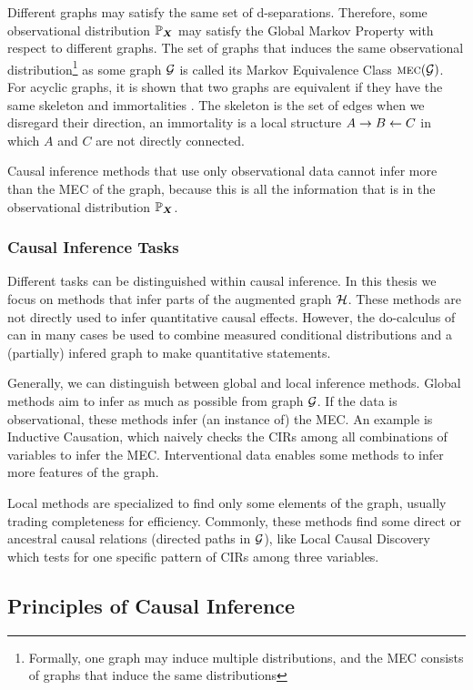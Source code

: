 Different graphs may satisfy the same set of d-separations. Therefore, some observational distribution $\mathbb{P}_{\bm{X}}$ may satisfy the Global Markov Property with respect to different graphs. The set of graphs that induces the same observational distribution\footnote{Formally, one graph may induce multiple distributions, and the MEC consists of graphs that induce the same distributions} as some graph $\mathcal{G}$ is called its Markov Equivalence Class $\text{\normalfont\scshape mec}(\mathcal{G})$. For acyclic graphs, it is shown that two graphs are equivalent if they have the same skeleton and immortalities \citep{verma1991equivalence}. The skeleton is the set of edges when we disregard their direction, an immortality is a local structure $A\to B \leftarrow C$ in which $A$ and $C$ are not directly connected.

Causal inference methods that use only observational data cannot infer more than the MEC of the graph, because this is all the information that is in the observational distribution $\mathbb{P}_{\bm{X}}$.


\subsubsection{Causal Inference Tasks}
Different tasks can be distinguished within causal inference. In this thesis we focus on methods that infer parts of the augmented graph $\mathcal{H}$. These methods are not directly used to infer quantitative causal effects. However, the do-calculus of \citet{pearl2009causality} can in many cases be used to combine measured conditional distributions and a (partially) infered graph to make quantitative statements.

Generally, we can distinguish between global and local inference methods. Global methods aim to infer as much as possible from graph $\mathcal{G}$. If the data is observational, these methods infer (an instance of) the MEC. An example is Inductive Causation, which naively checks the CIRs among all combinations of variables to infer the MEC. Interventional data enables some methods to infer more features of the graph. 

Local methods are specialized to find only some elements of the graph, usually trading completeness for efficiency. Commonly, these methods find some direct or ancestral causal relations (directed paths in $\mathcal{G}$), like Local Causal Discovery which tests for one specific pattern of CIRs among three variables.


\subsection{Principles of Causal Inference}
\label{sec:back:prin}

